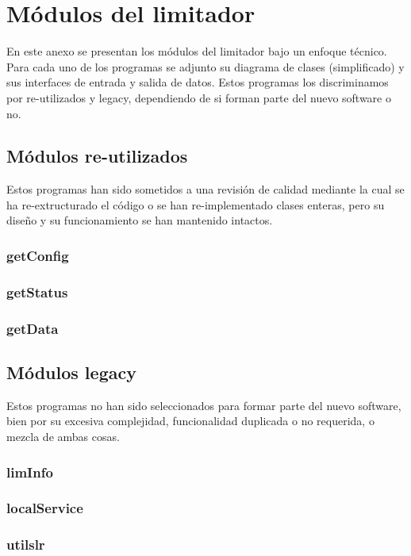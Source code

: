 \chapter{Módulos del limitador} \label{append:programas}

En este anexo se presentan los módulos del limitador bajo un enfoque técnico. Para cada uno de los programas se adjunto su diagrama de clases (simplificado) y sus interfaces de entrada y salida de datos. Estos programas los discriminamos por re-utilizados y legacy, dependiendo de si forman parte del nuevo software o no.

\section{Módulos re-utilizados}

Estos programas han sido sometidos a una revisión de calidad mediante la cual se ha re-extructurado el código o se han re-implementado clases enteras, pero su diseño y su funcionamiento se han mantenido intactos.

\subsection{getConfig} \label{append:getConfig}

\clearpage

\subsection{getStatus} \label{append:getStatus}

\clearpage

\subsection{getData} \label{append:getData}

\clearpage


\section{Módulos legacy}

Estos programas no han sido seleccionados para formar parte del nuevo software, bien por su excesiva complejidad, funcionalidad duplicada o no requerida, o mezcla de ambas cosas.

\subsection{limInfo} \label{append:limInfo}

\clearpage

\subsection{localService} \label{append:localservice}

\clearpage

\subsection{utilslr} \label{append:utilslr}

\clearpage
